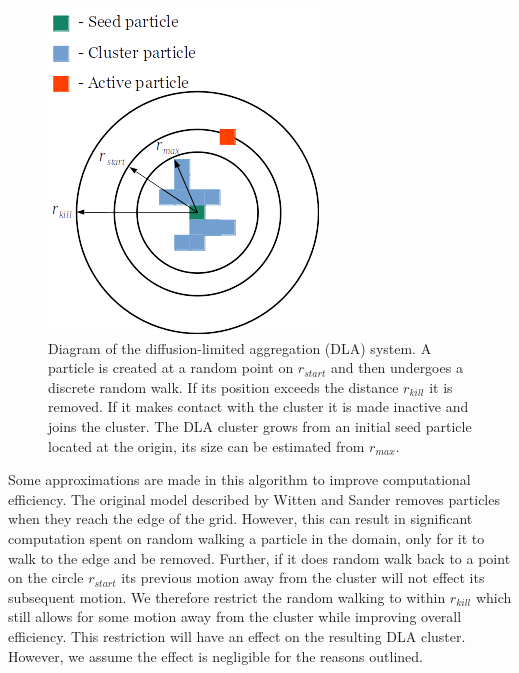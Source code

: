 \documentclass[10pt, twocolumn]{article} %
\begin{document}
\begin{figure}[t]
\centering
\includegraphics[width=0.95\columnwidth]{DLA_diagram.png}
  \caption{
    Diagram of the diffusion-limited aggregation (DLA) system. A particle is created at a random point on $r_{start}$ and then undergoes a discrete random walk. If its position exceeds the distance $r_{kill}$ it is removed. If it makes contact with the cluster it is made inactive and joins the cluster. The DLA cluster grows from an initial seed particle located at the origin, its size can be estimated from $r_{max}$.
  }
  \label{DLA_diagram}
\end{figure}

  Some approximations are made in this algorithm to improve computational efficiency. The original model described by Witten and Sander \cite{Witten_1981} removes particles when they reach the edge of the grid. However, this can result in significant computation spent on random walking a particle in the domain, only for it to walk to the edge and be removed. Further, if it does random walk back to a point on the circle $r_{start}$ its previous motion away from the cluster will not effect its subsequent motion. We therefore restrict the random walking to within $r_{kill}$ which still allows for some motion away from the cluster while improving overall efficiency. This restriction will have an effect on the resulting DLA cluster. However, we assume the effect is negligible for the reasons outlined.
\end{document}
